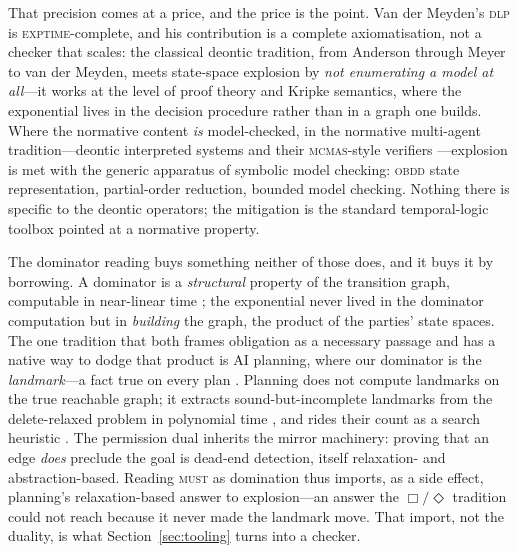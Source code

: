 That precision comes at a price, and the price is the point. Van der Meyden's
\textsc{dlp} is \textsc{exptime}-complete, and his contribution is a complete
axiomatisation, not a checker that scales: the classical deontic tradition, from
Anderson through Meyer to van der Meyden, meets state-space explosion by
\emph{not enumerating a model at all}---it works at the level of proof theory and
Kripke semantics, where the exponential lives in the decision procedure rather
than in a graph one builds. Where the normative content \emph{is} model-checked,
in the normative multi-agent tradition---deontic interpreted systems and their
\textsc{mcmas}-style verifiers ---explosion is met
with the generic apparatus of symbolic model checking: \textsc{obdd} state
representation, partial-order reduction, bounded model checking. Nothing there is
specific to the deontic operators; the mitigation is the standard temporal-logic
toolbox pointed at a normative property.

The dominator reading buys something neither of those does, and it buys it by
borrowing. A dominator is a \emph{structural} property of the transition
graph, computable in near-linear time ; the
exponential never lived in the dominator computation but in \emph{building} the
graph, the product of the parties' state spaces. The one tradition that both
frames obligation as a necessary passage and has a native way to dodge that
product is AI planning, where our dominator is the \emph{landmark}---a fact true
on every plan . Planning does not
compute landmarks on the true reachable graph; it extracts sound-but-incomplete
landmarks from the delete-relaxed problem in polynomial time
, and rides their count as a search heuristic
. The permission dual inherits the mirror
machinery: proving that an edge \emph{does} preclude the goal is dead-end
detection, itself relaxation- and abstraction-based. Reading \textsc{must} as
domination thus imports, as a side effect, planning's relaxation-based answer to
explosion---an answer the $\Box/\Diamond$ tradition could not reach because it
never made the landmark move. That import, not the duality, is what
Section~\ref{sec:tooling} turns into a checker.
